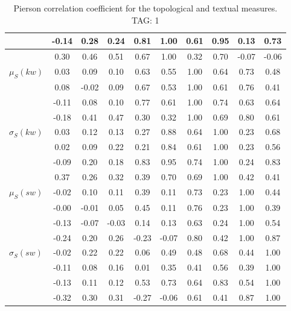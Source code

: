 \begin{table*}[h!]
\begin{center}
\begin{tabular}{| l | c | c | c | c | c | c | c | c | c |}
 & -0.14  & 0.28  & 0.24  & 0.81  & 1.00  & 0.61  & 0.95  & 0.13  & 0.73 \\\hline
 & 0.30  & 0.46  & 0.51  & 0.67  & 1.00  & 0.32  & 0.70  & -0.07  & -0.06 \\\hline
$\mu_S(kw)$ & 0.03  & 0.09  & 0.10  & 0.63  & 0.55  & 1.00  & 0.64  & 0.73  & 0.48 \\\hline
 & 0.08  & -0.02  & 0.09  & 0.67  & 0.53  & 1.00  & 0.61  & 0.76  & 0.41 \\\hline
 & -0.11  & 0.08  & 0.10  & 0.77  & 0.61  & 1.00  & 0.74  & 0.63  & 0.64 \\\hline
 & -0.18  & 0.41  & 0.47  & 0.30  & 0.32  & 1.00  & 0.69  & 0.80  & 0.61 \\\hline
$\sigma_S(kw)$ & 0.03  & 0.12  & 0.13  & 0.27  & 0.88  & 0.64  & 1.00  & 0.23  & 0.68 \\\hline
 & 0.02  & 0.09  & 0.22  & 0.21  & 0.84  & 0.61  & 1.00  & 0.23  & 0.56 \\\hline
 & -0.09  & 0.20  & 0.18  & 0.83  & 0.95  & 0.74  & 1.00  & 0.24  & 0.83 \\\hline
 & 0.37  & 0.26  & 0.32  & 0.39  & 0.70  & 0.69  & 1.00  & 0.42  & 0.41 \\\hline
$\mu_S(sw)$ & -0.02  & 0.10  & 0.11  & 0.39  & 0.11  & 0.73  & 0.23  & 1.00  & 0.44 \\\hline
 & -0.00  & -0.01  & 0.05  & 0.45  & 0.11  & 0.76  & 0.23  & 1.00  & 0.39 \\\hline
 & -0.13  & -0.07  & -0.03  & 0.14  & 0.13  & 0.63  & 0.24  & 1.00  & 0.54 \\\hline
 & -0.24  & 0.20  & 0.26  & -0.23  & -0.07  & 0.80  & 0.42  & 1.00  & 0.87 \\\hline
$\sigma_S(sw)$ & -0.02  & 0.22  & 0.22  & 0.06  & 0.49  & 0.48  & 0.68  & 0.44  & 1.00 \\\hline
 & -0.11  & 0.08  & 0.16  & 0.01  & 0.35  & 0.41  & 0.56  & 0.39  & 1.00 \\\hline
 & -0.13  & 0.11  & 0.12  & 0.53  & 0.73  & 0.64  & 0.83  & 0.54  & 1.00 \\\hline
 & -0.32  & 0.30  & 0.31  & -0.27  & -0.06  & 0.61  & 0.41  & 0.87  & 1.00 \\\hline
\end{tabular}
\caption{Pierson correlation coefficient for the topological and textual measures. TAG: 1}
\end{center}
\end{table*}